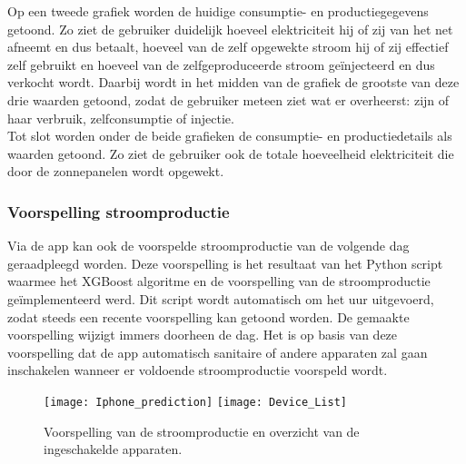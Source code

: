Op een tweede grafiek worden de huidige consumptie- en productiegegevens getoond. Zo ziet de gebruiker duidelijk hoeveel elektriciteit hij of zij van het net afneemt en dus betaalt, hoeveel van de zelf opgewekte stroom hij of zij effectief zelf gebruikt en hoeveel van de zelfgeproduceerde stroom geïnjecteerd en dus verkocht wordt. Daarbij wordt in het midden van de grafiek de grootste van deze drie waarden getoond, zodat de gebruiker meteen ziet wat er overheerst: zijn of haar verbruik, zelfconsumptie of injectie. \\

Tot slot worden onder de beide grafieken de consumptie- en productiedetails als waarden getoond. Zo ziet de gebruiker ook de totale hoeveelheid elektriciteit die door de zonnepanelen wordt opgewekt.

\subsubsection{Voorspelling stroomproductie}

Via de app kan ook de voorspelde stroomproductie van de volgende dag geraadpleegd worden. Deze voorspelling is het resultaat van het Python script waarmee het XGBoost algoritme en de voorspelling van de stroomproductie geïmplementeerd werd. Dit script wordt automatisch om het uur uitgevoerd, zodat steeds een recente voorspelling kan getoond worden. De gemaakte voorspelling wijzigt immers doorheen de dag. Het is op basis van deze voorspelling dat de app automatisch sanitaire of andere apparaten zal gaan inschakelen wanneer er voldoende stroomproductie voorspeld wordt. 

\begin{figure}[h!]
    \centering
    \texttt{[image: Iphone\_prediction]} \hspace{0.5cm}
    \texttt{[image: Device\_List]}
    \caption{Voorspelling van de stroomproductie en overzicht van de ingeschakelde apparaten.}
\end{figure}

\newpage
\subsection{}%
\label{sec:Aansturing slimme stekkers aansturen op basis van de voorspelde stroomproductie}


